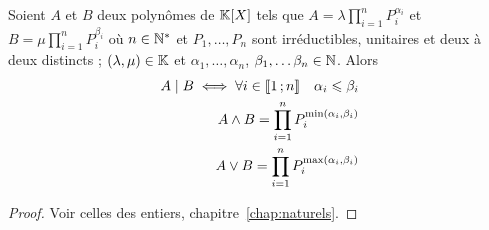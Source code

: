 \begin{cor}
  Soient $A$ et $B$ deux polynômes de $\mathbb{K}[X]$ tels que $A=\lambda \prod_{i=1}^n P_i^{\alpha_i}$ et $B=\mu \prod_{i=1}^n P_i^{\beta_i}$ où $n \in \mathbb{N}^*$ et $P_1, \ldots, P_n$ sont irréductibles, unitaires et deux à deux distincts ; $(\lambda, \mu)\in\mathbb{K}$ et $\alpha_1, \ldots, \alpha_n$, $\beta_1,\ldots \beta_n \in \mathbb{N}$. Alors
  \begin{align}
    A\mid{}B \iff \forall i \in \mathopen{\llbracket}1\mathclose{}\mathpunct{};n\mathclose{\rrbracket} \quad \alpha_i \leqslant \beta_i \\
    A \wedge B = \prod_{i=1}^n P_i^{\min(\alpha_i,\beta_i)}\\
    A \vee B = \prod_{i=1}^n P_i^{\max(\alpha_i,\beta_i)}
  \end{align}
\end{cor}
\begin{proof}
  Voir celles des entiers, chapitre~\ref{chap:naturels}.
\end{proof}